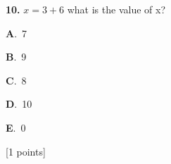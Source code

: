 \documentclass[12pt]{article}
\newcommand{\choice}[3]{%
  \noindent\textbf{#1}.~#2\hfill#3\par\vspace{0.25em}
}
\begin{document}
\noindent \textbf{\textenglish{10.}} \(x=3+6 \){\textenglish{ what is the value of x?}}

\noindent\choice{A}{{\textenglish{7}}}{}
\noindent\choice{B}{{\textenglish{9}}}{}
\noindent\choice{C}{{\textenglish{8}}}{}
\noindent\choice{D}{{\textenglish{10}}}{}
\noindent\choice{E}{{\textenglish{0}}}{}
\hfill {\textenglish{[1 points]}}\\[0.5em]
\end{document}
